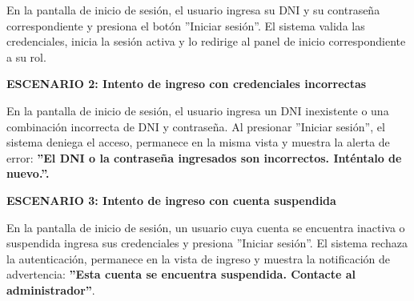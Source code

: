 \documentclass[a4paper,9pt]{article}
\begin{document}
\begin{tcolorbox}[hucard, title={\textbf{HU-52: INICIAR SESIÓN COMO ADMINISTRATIVO} \hfill \scriptsize \colorbox{slatestatus}{\textbf{\ Done\ }} \quad \colorbox{white}{\textcolor{primarydark}{\textbf{\ 2 pts\ }}}}]
{En la pantalla de inicio de sesión, el usuario ingresa su DNI y su contraseña correspondiente y presiona el botón ''Iniciar sesión''. El sistema valida las credenciales, inicia la sesión activa y lo redirige al panel de inicio correspondiente a su rol.\par\vspace{2.5pt}
\noindent\textbf{\textcolor{secondarydark}{ESCENARIO 2:  Intento de ingreso con credenciales incorrectas}}\par\vspace{1pt}
En la pantalla de inicio de sesión, el usuario ingresa un DNI inexistente o una combinación incorrecta de DNI y contraseña. Al presionar ''Iniciar sesión'', el sistema deniega el acceso, permanece en la misma vista y muestra la alerta de error: \textbf{''El DNI o la contraseña ingresados son incorrectos. Inténtalo de nuevo.''.}\par\vspace{2.5pt}
\noindent\textbf{\textcolor{secondarydark}{ESCENARIO 3:  Intento de ingreso con cuenta suspendida}}\par\vspace{1pt}
En la pantalla de inicio de sesión, un usuario cuya cuenta se encuentra inactiva o suspendida ingresa sus credenciales y presiona ''Iniciar sesión''. El sistema rechaza la autenticación, permanece en la vista de ingreso y muestra la notificación de advertencia: \textbf{''Esta cuenta se encuentra suspendida. Contacte al administrador''}.\par\vspace{2.5pt}
}\par
\end{tcolorbox}
\end{document}
